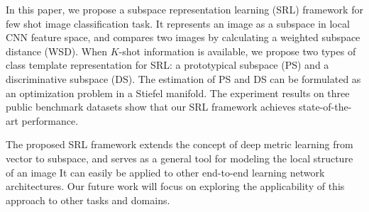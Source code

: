 In this paper, we propose a subspace representation learning (SRL) framework for few shot image classification task.
It represents an image as a subspace in local CNN feature space, and compares two images by calculating a weighted subspace distance (WSD).
When $K$-shot information is available, we propose two types of class template representation for SRL: a prototypical subspace (PS) and a discriminative subspace (DS).
The estimation of PS and DS can be formulated as an optimization problem in a Stiefel manifold.
The experiment results on three public benchmark datasets show that our SRL framework achieves state-of-the-art performance.

The proposed SRL framework extends the concept of deep metric learning from vector to subspace, and serves as a general tool for modeling the local structure of an image
It can easily be applied to other end-to-end learning network architectures.
Our future work will focus on exploring the applicability of this approach to other tasks and domains.

